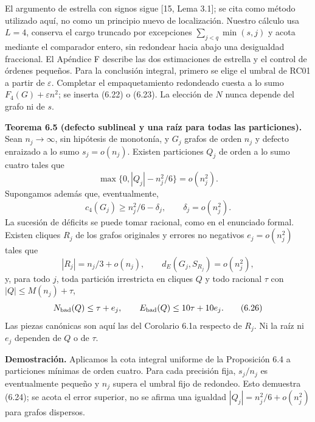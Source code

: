 \documentclass[spanish,11pt,a4paper]{article}
\begin{document}
El argumento de estrella con signos sigue {[}15, Lema 3.1{]}; se cita como método utilizado aquí, no como un principio nuevo de localización. Nuestro cálculo usa \(L=4\), conserva el cargo truncado por excepciones \(\sum_{j<q}\min(s,j)\) y acota mediante el comparador entero, sin redondear hacia abajo una desigualdad fraccional. El Apéndice F describe las dos estimaciones de estrella y el control de órdenes pequeños. Para la conclusión integral, primero se elige el umbral de RC01 a partir de \(\varepsilon\). Completar el empaquetamiento redondeado cuesta a lo sumo \(F_4(G)+\varepsilon n^2\); se inserta (6.22) o (6.23). La elección de \(N\) nunca depende del grafo ni de \(s\).


\textbf{Teorema 6.5 (defecto sublineal y una raíz para todas las particiones).} Sean \(n_j\to\infty\), sin hipótesis de monotonía, y \(G_j\) grafos de orden \(n_j\) y defecto enraizado a lo sumo \(s_j=o(n_j)\). Existen particiones \(Q_j\) de orden a lo sumo cuatro tales que \[
\max\{0,|Q_j|-n_j^2/6\}=o(n_j^2).
\tag{6.24}
\] Supongamos además que, eventualmente, \[
c_4(G_j)\ge n_j^2/6-\delta_j,\qquad \delta_j=o(n_j^2).
\] La sucesión de déficits se puede tomar racional, como en el enunciado formal. Existen cliques \(R_j\) de los grafos originales y errores no negativos \(e_j=o(n_j^2)\) tales que \[
|R_j|=n_j/3+o(n_j),\qquad
d_E(G_j,S_{R_j})=o(n_j^2),
\tag{6.25}
\] y, para todo \(j\), toda partición irrestricta en cliques \(Q\) y todo racional \(\tau\) con \(|Q|\le M(n_j)+\tau\), \[
N_{\rm bad}(Q)\le\tau+e_j,\qquad
E_{\rm bad}(Q)\le10\tau+10e_j.
\tag{6.26}
\] Las piezas canónicas son aquí las del Corolario 6.1a respecto de \(R_j\). Ni la raíz ni \(e_j\) dependen de \(Q\) o de \(\tau\).

\textbf{Demostración.} Aplicamos la cota integral uniforme de la Proposición 6.4 a particiones mínimas de orden cuatro. Para cada precisión fija, \(s_j/n_j\) es eventualmente pequeño y \(n_j\) supera el umbral fijo de redondeo. Esto demuestra (6.24); se acota el error superior, no se afirma una igualdad \(|Q_j|=n_j^2/6+o(n_j^2)\) para grafos dispersos.
\end{document}
